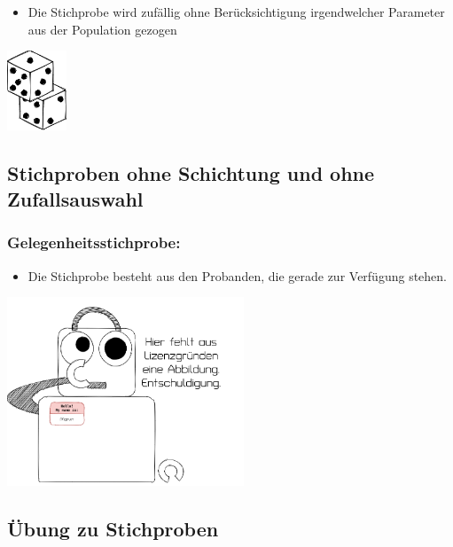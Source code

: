 \documentclass[
]{book}
\providecommand{\tightlist}{%
  \setlength{\itemsep}{0pt}\setlength{\parskip}{0pt}}
\begin{document}
\begin{itemize}
\tightlist
\item
  Die Stichprobe wird zufällig ohne Berücksichtigung irgendwelcher Parameter aus der Population gezogen
\end{itemize}

\begin{center}\includegraphics[width=50pt]{imgs/dice} \end{center}

\hypertarget{stichproben-ohne-schichtung-und-ohne-zufallsauswahl}{%
\subsection{Stichproben ohne Schichtung und ohne Zufallsauswahl}\label{stichproben-ohne-schichtung-und-ohne-zufallsauswahl}}

\hypertarget{gelegenheitsstichprobe}{%
\subsubsection{Gelegenheitsstichprobe:}\label{gelegenheitsstichprobe}}

\begin{itemize}
\tightlist
\item
  Die Stichprobe besteht aus den Probanden, die gerade zur Verfügung stehen.
\end{itemize}

\begin{center}\includegraphics[width=200pt]{imgs/copyright} \end{center}

\hypertarget{uxfcbung-zu-stichproben}{%
\subsection{Übung zu Stichproben}\label{uxfcbung-zu-stichproben}}
\end{document}
